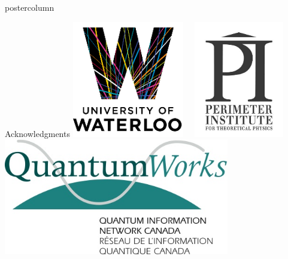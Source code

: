 \documentclass[final]{beamer} %
\begin{document}
\begin{frame}{}
\begin{columns}
\begin{column}{.33\textwidth}
\begin{beamercolorbox}[center,wd=\textwidth]{postercolumn}
\begin{minipage}[T]{.95\textwidth}
\begin{block}{\large Acknowledgments}
             \centering 
             \includegraphics[height=2in]{figures/Waterloo_Logo.PNG} \ \ \includegraphics[height=2in]{figures/PI_Logo.PNG} \ \ \includegraphics[height=2in]{figures/QuantumWorks_Logo.PNG}
           \end{block}

         \end{minipage}
      \end{beamercolorbox}
    \end{column}




  \end{columns}
  \end{frame}
\end{document}
